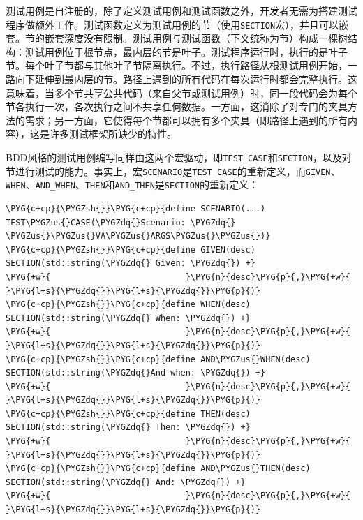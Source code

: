 
测试用例是自注册的，除了定义测试用例和测试函数之外，开发者无需为搭建测试程序做额外工作。测试函数定义为测试用例的节（使用\texttt{SECTION}宏），并且可以嵌套。节的嵌套深度没有限制。测试用例与测试函数（下文统称为节）构成一棵树结构：测试用例位于根节点，最内层的节是叶子。测试程序运行时，执行的是叶子节。每个叶子节都与其他叶子节隔离执行。不过，执行路径从根测试用例开始，一路向下延伸到最内层的节。路径上遇到的所有代码在每次运行时都会完整执行。这意味着，当多个节共享公共代码（来自父节或测试用例）时，同一段代码会为每个节各执行一次，各次执行之间不共享任何数据。一方面，这消除了对专门的夹具方法的需求；另一方面，它使得每个节都可以拥有多个夹具（即路径上遇到的所有内容），这是许多测试框架所缺少的特性。



BDD风格的测试用例编写同样由这两个宏驱动，即\texttt{TEST\_\allowbreak{}CASE}和\texttt{SECTION}，以及对节进行测试的能力。事实上，宏\texttt{SCENARIO}是\texttt{TEST\_\allowbreak{}CASE}的重新定义，而\texttt{GIVEN}、\texttt{WHEN}、\texttt{AND\_\allowbreak{}WHEN}、\texttt{THEN}和\texttt{AND\_\allowbreak{}THEN}是\texttt{SECTION}的重新定义：



\begin{codeblockbg}
\begin{Verbatim}[commandchars=\\\{\},breaklines=true,breakanywhere=true,fontsize=\codefont,xleftmargin=17bp]
\PYG{c+cp}{\PYGZsh{}}\PYG{c+cp}{define SCENARIO(...) TEST\PYGZus{}CASE(\PYGZdq{}Scenario: \PYGZdq{} \PYGZus{}\PYGZus{}VA\PYGZus{}ARGS\PYGZus{}\PYGZus{})}
\PYG{c+cp}{\PYGZsh{}}\PYG{c+cp}{define GIVEN(desc) SECTION(std::string(\PYGZdq{} Given: \PYGZdq{}) +}
\PYG{+w}{                           }\PYG{n}{desc}\PYG{p}{,}\PYG{+w}{ }\PYG{l+s}{\PYGZdq{}}\PYG{l+s}{\PYGZdq{}}\PYG{p}{)}
\PYG{c+cp}{\PYGZsh{}}\PYG{c+cp}{define WHEN(desc) SECTION(std::string(\PYGZdq{} When: \PYGZdq{}) +}
\PYG{+w}{                           }\PYG{n}{desc}\PYG{p}{,}\PYG{+w}{ }\PYG{l+s}{\PYGZdq{}}\PYG{l+s}{\PYGZdq{}}\PYG{p}{)}
\PYG{c+cp}{\PYGZsh{}}\PYG{c+cp}{define AND\PYGZus{}WHEN(desc) SECTION(std::string(\PYGZdq{}And when: \PYGZdq{}) +}
\PYG{+w}{                           }\PYG{n}{desc}\PYG{p}{,}\PYG{+w}{ }\PYG{l+s}{\PYGZdq{}}\PYG{l+s}{\PYGZdq{}}\PYG{p}{)}
\PYG{c+cp}{\PYGZsh{}}\PYG{c+cp}{define THEN(desc) SECTION(std::string(\PYGZdq{} Then: \PYGZdq{}) +}
\PYG{+w}{                           }\PYG{n}{desc}\PYG{p}{,}\PYG{+w}{ }\PYG{l+s}{\PYGZdq{}}\PYG{l+s}{\PYGZdq{}}\PYG{p}{)}
\PYG{c+cp}{\PYGZsh{}}\PYG{c+cp}{define AND\PYGZus{}THEN(desc) SECTION(std::string(\PYGZdq{} And: \PYGZdq{}) +}
\PYG{+w}{                           }\PYG{n}{desc}\PYG{p}{,}\PYG{+w}{ }\PYG{l+s}{\PYGZdq{}}\PYG{l+s}{\PYGZdq{}}\PYG{p}{)}
\end{Verbatim}
\end{codeblockbg}


